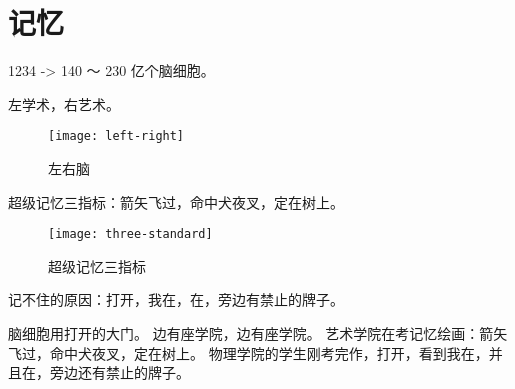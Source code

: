 \section{记忆}

1234 -> 140 ～ 230 亿个脑细胞。

左学术，右艺术。
\begin{figure}[H]
  \centering
  \texttt{[image: left-right]}
  \caption{左右脑}
\end{figure}

超级记忆三指标：箭矢飞过，命中犬夜叉，定在树上。
\begin{figure}[H]
  \centering
  \texttt{[image: three-standard]}
  \caption{超级记忆三指标}
\end{figure}


记不住的原因：打开，我在，在，旁边有禁止的牌子。

\begin{tcolorbox}
脑细胞用打开的大门。
边有座学院，边有座学院。
艺术学院在考记忆绘画：箭矢飞过，命中犬夜叉，定在树上。
物理学院的学生刚考完作，打开，看到我在，并且在，旁边还有禁止的牌子。


\end{tcolorbox}

